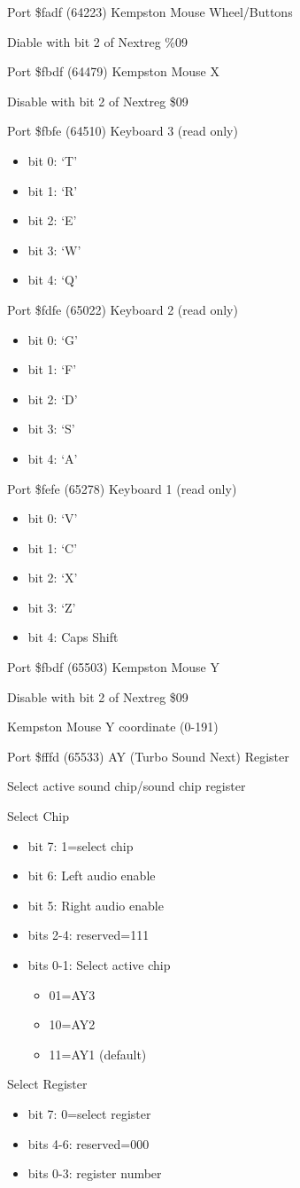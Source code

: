 Port \$fadf (64223) Kempston Mouse Wheel/Buttons

Diable with bit 2 of Nextreg \%09

Port \$fbdf (64479) Kempston Mouse X

Disable with bit 2 of Nextreg \$09

Port \$fbfe (64510) Keyboard 3 (read only)
\begin{itemize}
\item[] bit 0: ‘T’
\item[] bit 1: ‘R’
\item[] bit 2: ‘E’
\item[] bit 3: ‘W’
\item[] bit 4: ‘Q’
\end{itemize}

Port \$fdfe (65022) Keyboard 2 (read only)
\begin{itemize}
\item[] bit 0: ‘G’
\item[] bit 1: ‘F’
\item[] bit 2: ‘D’
\item[] bit 3: ‘S’
\item[] bit 4: ‘A’
\end{itemize}

Port \$fefe (65278) Keyboard 1 (read only)
\begin{itemize}
\item[] bit 0: ‘V’
\item[] bit 1: ‘C’
\item[] bit 2: ‘X’
\item[] bit 3: ‘Z’
\item[] bit 4: Caps Shift
\end{itemize}

Port \$fbdf (65503) Kempston Mouse Y

Disable with bit 2 of Nextreg \$09

Kempston Mouse Y coordinate (0-191)

Port \$fffd (65533) AY (Turbo Sound Next) Register

Select active sound chip/sound chip register

Select Chip
\begin{itemize}
\item[] bit 7: 1=select chip
\item[] bit 6: Left audio enable
\item[] bit 5: Right audio enable
\item[] bits 2-4: reserved=111
\item[] bits 0-1: Select active chip
  \begin{itemize}
  \item[] 01=AY3
  \item[] 10=AY2
  \item[] 11=AY1 (default)
  \end{itemize}
\end{itemize}
 Select Register
\begin{itemize}
\item[] bit 7: 0=select register
\item[] bits 4-6: reserved=000
\item[] bits 0-3: register number
\end{itemize}
